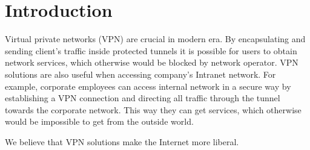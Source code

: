 \section{Introduction}
\label{section:introduction}

Virtual private networks (VPN) are crucial in modern era.
By encapsulating and sending client’s traffic inside protected
tunnels it is possible for users to obtain network services,
which otherwise would be blocked by network operator.
VPN solutions are also useful when accessing company’s Intranet
network. For example, corporate employees can access internal
network in a secure way by establishing a VPN connection and
directing all traffic through the tunnel towards the corporate
network. This way they can get services, which otherwise
would be impossible to get from the outside world.

We believe that VPN solutions make the Internet more liberal.